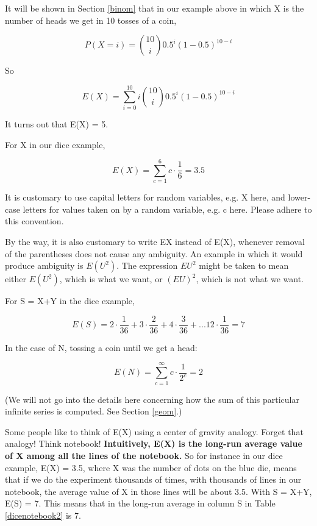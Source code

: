 It will be shown in Section \ref{binom} that in our example above in
which X is the number of heads we get in 10 tosses of a coin,

\begin{equation}
P(X = i) =  \binom{10}{i} 0.5^i (1-0.5)^{10-i}  
\end{equation}

So

\begin{equation}
E(X) =  \sum_{i=0}^{10} i \binom{10}{i} 0.5^i (1-0.5)^{10-i}  
\end{equation}

It turns out that E(X) = 5.

For X in our dice example, 

\begin{equation}
E(X) = \sum_{c=1}^6 c \cdot \frac{1}{6} = 3.5
\end{equation}

It is customary to use capital letters for random variables, e.g. X
here, and lower-case letters for values taken on by a random variable,
e.g. c here.  Please adhere to this convention.  

By the way, it is also customary to write EX instead of E(X), whenever
removal of the parentheses does not cause any ambiguity.  An example in
which it would produce ambiguity is $E(U^2)$.  The expression $EU^2$
might be taken to mean either $E(U^2)$, which is what we want, or
$(EU)^2$, which is not what we want.

For S = X+Y in the dice example,

\begin{equation}
\label{es}
E(S) = 
2 \cdot \frac{1}{36} +
3 \cdot \frac{2}{36} +
4 \cdot \frac{3}{36} +
...
12 \cdot \frac{1}{36} = 7
\end{equation}

In the case of N, tossing a coin until we get a head:

\begin{equation}
E(N) = \sum_{c=1}^\infty c \cdot \frac{1}{2^c} =  2
\end{equation}

(We will not go into the details here concerning how the sum of this
particular infinite series is computed.  See Section \ref{geom}.)

Some people like to think of E(X) using a center of gravity analogy.
Forget that analogy!  Think notebook!  {\bf Intuitively, E(X) is the
long-run average value of X among all the lines of the notebook.}  So
for instance in our dice example, E(X) = 3.5, where X was the number of
dots on the blue die, means that if we do the experiment thousands of
times, with thousands of lines in our notebook, the average value of X
in those lines will be about 3.5.   With S = X+Y, E(S) = 7.  This means
that in the long-run average in column S in Table \ref{dicenotebook2} is
7.

